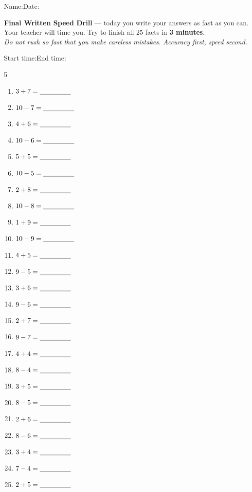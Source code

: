 \documentclass[12pt, letterpaper]{article}
\begin{document}

{\small Name:\ansblanklg \hfill Date:\ansblank}
\goldrule

\begin{instructbox}
\textbf{Final Written Speed Drill} — today you write your answers as fast as you can.\\
Your teacher will time you. Try to finish all 25 facts in \textbf{3 minutes}.\\
\textit{Do not rush so fast that you make careless mistakes. Accuracy first, speed second.}
\end{instructbox}

\bigskip
{} \hfill
{\small Start time:\ansblank \quad End time:\ansblank}

\bigskip
\begin{multicols}{5}
\begin{enumerate}[leftmargin=*,label=\textbf{\arabic*.},itemsep=11pt]
  \item $3+7=\underline{\hspace{1.6cm}}$
  \item $10-7=\underline{\hspace{1.6cm}}$
  \item $4+6=\underline{\hspace{1.6cm}}$
  \item $10-6=\underline{\hspace{1.6cm}}$
  \item $5+5=\underline{\hspace{1.6cm}}$
  \item $10-5=\underline{\hspace{1.6cm}}$
  \item $2+8=\underline{\hspace{1.6cm}}$
  \item $10-8=\underline{\hspace{1.6cm}}$
  \item $1+9=\underline{\hspace{1.6cm}}$
  \item $10-9=\underline{\hspace{1.6cm}}$
  \item $4+5=\underline{\hspace{1.6cm}}$
  \item $9-5=\underline{\hspace{1.6cm}}$
  \item $3+6=\underline{\hspace{1.6cm}}$
  \item $9-6=\underline{\hspace{1.6cm}}$
  \item $2+7=\underline{\hspace{1.6cm}}$
  \item $9-7=\underline{\hspace{1.6cm}}$
  \item $4+4=\underline{\hspace{1.6cm}}$
  \item $8-4=\underline{\hspace{1.6cm}}$
  \item $3+5=\underline{\hspace{1.6cm}}$
  \item $8-5=\underline{\hspace{1.6cm}}$
  \item $2+6=\underline{\hspace{1.6cm}}$
  \item $8-6=\underline{\hspace{1.6cm}}$
  \item $3+4=\underline{\hspace{1.6cm}}$
  \item $7-4=\underline{\hspace{1.6cm}}$
  \item $2+5=\underline{\hspace{1.6cm}}$
\end{enumerate}
\end{multicols}
\end{document}
